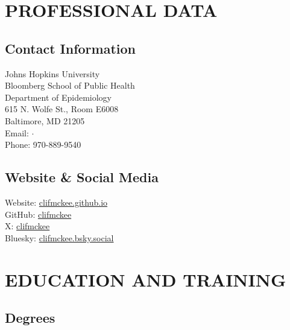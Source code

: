 \documentclass{cv}
\begin{document}


\section*{PROFESSIONAL DATA}

\subsection*{Contact Information}

Johns Hopkins University \\
Bloomberg School of Public Health \\
Department of Epidemiology \\
615 N. Wolfe St., Room E6008\\
Baltimore, MD 21205 \\
Email:  $\cdot$  \\
Phone: 970-889-9540

\subsection*{Website \& Social Media}

Website: \href{https://clifmckee.github.io/}{clifmckee.github.io} \\
GitHub: \href{https://github.com/clifmckee/}{clifmckee} \\
X: \href{https://twitter.com/clifmckee/}{clifmckee} \\
Bluesky: \href{https://bsky.app/profile/clifmckee.bsky.social}{clifmckee.bsky.social}


\section*{EDUCATION AND TRAINING}

\subsection*{Degrees}
\end{document}

